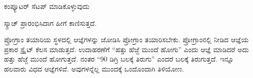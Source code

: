 \newpage
\begin{center}
\Large{ಕಂಪ್ಯೂಟರ್ ಸೆಟಪ್ ಮಾಡಿಕೊಳ್ಳುವುದು}
\end{center}
\vspace{1cm}
ಸ್ಕ್ರಾಚ್ ಪ್ರಾರಂಭಿಸಿದಾಗ ಹೀಗೆ ಕಾಣಿಸುತ್ತದೆ. \par

ಪ್ರೋಗ್ರಾಂ ತಯಾರಿಯ ಸ್ಥಳದಲ್ಲಿ ಆಜ್ಞೆಗಳನ್ನು ಜೋಡಿಸಿ ಪ್ರೋಗ್ರಾಂ ತಯಾರಿಸಬೇಕು. ಪ್ರೋಗ್ರಾಂನಲ್ಲಿ ನೀಡಿದ ಆಜ್ಞೆಯ ಪ್ರಕಾರ ಸ್ಪ್ರೈಟ್ ಕೆಲಸ ಮಾಡುತ್ತದೆ. ಉದಾಹರಣೆಗೆ “ಹತ್ತು ಹೆಜ್ಜೆ ಮುಂದೆ ಹೋಗು” ಎಂದು ಆಜ್ಞೆ ಮಾಡಿದರೆ ಅದು ಹತ್ತು ಹೆಜ್ಜೆ ಮುಂದೆ ಹೋಗುತ್ತದೆ. ನಂತರ “90 ಡಿಗ್ರಿ ಬಲಕ್ಕೆ ತಿರುಗು” ಎಂದರೆ ಬಲಕ್ಕೆ ತಿರುಗುತ್ತದೆ. ಇನ್ನೂ ಹಲವಾರು ವಿಧದ ಆಜ್ಞೆಗಳಿವೆ. ಅವುಗಳನ್ನೆಲ್ಲ ಮುಂದಕ್ಕೆ ಒಂದೊಂದಾಗಿ ತಿಳಿಯೋಣ.
\vspace{1cm}

